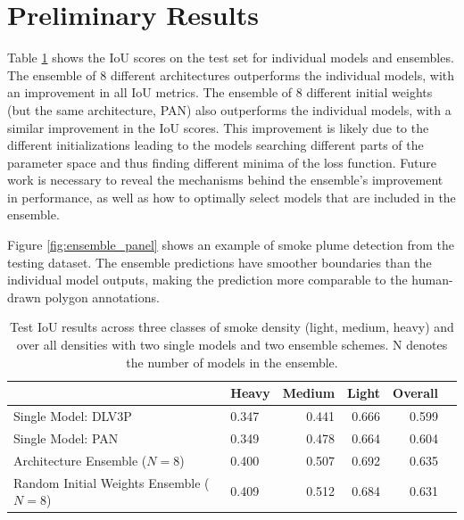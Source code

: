 \documentclass{article}
\begin{document}
\section{Preliminary Results}
Table \ref{tab:results} shows the IoU scores on the test set for individual models and ensembles. The ensemble of 8 different architectures outperforms the individual models, with an improvement in all IoU metrics. The ensemble of 8 different initial weights (but the same architecture, PAN) also outperforms the individual models, with a similar improvement in the IoU scores. This improvement is likely due to the different initializations leading to the models searching different parts of the parameter space and thus finding different minima of the loss function. Future work is necessary to reveal the mechanisms behind the ensemble's improvement in performance, as well as how to optimally select models that are included in the ensemble.

Figure \ref{fig:ensemble_panel} shows an example of smoke plume detection from the testing dataset. The ensemble predictions have smoother boundaries than the individual model outputs, making the prediction more comparable to the human-drawn polygon annotations.
\begin{table}[h]
    \centering
    \caption{Test IoU results across three classes of smoke density (light, medium, heavy) and over all densities with two single models and two ensemble schemes. N denotes the number of models in the ensemble.}
    \label{tab:results}
    \begin{tabular}{llrrr>{\bfseries}r}
        \hline
            &   Heavy &   Medium &   Light &   Overall \\
        \hline
        Single Model: DLV3P \citep{dlv3p} &   0.347 &     0.441 &  0.666 &      0.599  \\
        Single Model: PAN \citep{PAN} &  0.349 &     0.478 &  0.664 &      0.604 \\
        Architecture Ensemble ($N=8$) &   0.400 &     0.507 &  0.692 &      0.635 \\
        Random Initial Weights Ensemble ($N=8$) &  0.409 &     0.512 &  0.684 &      0.631 \\
         \hline
    \end{tabular}
    \end{table}
\end{document}
